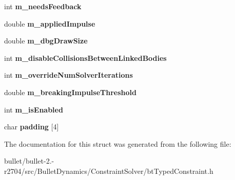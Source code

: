 \begin{DoxyCompactItemize}
\item 
\hypertarget{structbt_typed_constraint_double_data_ae1b5ca58ea9d157a5d88826237f251bf}{int {\bfseries m\+\_\+needs\+Feedback}}\label{structbt_typed_constraint_double_data_ae1b5ca58ea9d157a5d88826237f251bf}

\item 
\hypertarget{structbt_typed_constraint_double_data_a2ea43f8cbc1efa8c14a830cd6e39e316}{double {\bfseries m\+\_\+applied\+Impulse}}\label{structbt_typed_constraint_double_data_a2ea43f8cbc1efa8c14a830cd6e39e316}

\item 
\hypertarget{structbt_typed_constraint_double_data_aa969de61c274f3098e9bde3e15e168d1}{double {\bfseries m\+\_\+dbg\+Draw\+Size}}\label{structbt_typed_constraint_double_data_aa969de61c274f3098e9bde3e15e168d1}

\item 
\hypertarget{structbt_typed_constraint_double_data_aa8de23349fe9d9a2c7e6da156c44626f}{int {\bfseries m\+\_\+disable\+Collisions\+Between\+Linked\+Bodies}}\label{structbt_typed_constraint_double_data_aa8de23349fe9d9a2c7e6da156c44626f}

\item 
\hypertarget{structbt_typed_constraint_double_data_ad453be2297840b0dead1247b6c83925c}{int {\bfseries m\+\_\+override\+Num\+Solver\+Iterations}}\label{structbt_typed_constraint_double_data_ad453be2297840b0dead1247b6c83925c}

\item 
\hypertarget{structbt_typed_constraint_double_data_abe82e2a1482fa494f8be799e468a7fa7}{double {\bfseries m\+\_\+breaking\+Impulse\+Threshold}}\label{structbt_typed_constraint_double_data_abe82e2a1482fa494f8be799e468a7fa7}

\item 
\hypertarget{structbt_typed_constraint_double_data_ac259b9b804341c00d87b2d2ff917a3ba}{int {\bfseries m\+\_\+is\+Enabled}}\label{structbt_typed_constraint_double_data_ac259b9b804341c00d87b2d2ff917a3ba}

\item 
\hypertarget{structbt_typed_constraint_double_data_a32d2a48e711fe812cc25536fc13ce6c1}{char {\bfseries padding} \mbox{[}4\mbox{]}}\label{structbt_typed_constraint_double_data_a32d2a48e711fe812cc25536fc13ce6c1}

\end{DoxyCompactItemize}


The documentation for this struct was generated from the following file\+:\begin{DoxyCompactItemize}
\item 
bullet/bullet-\/2.-\/r2704/src/\+Bullet\+Dynamics/\+Constraint\+Solver/bt\+Typed\+Constraint.\+h\end{DoxyCompactItemize}
